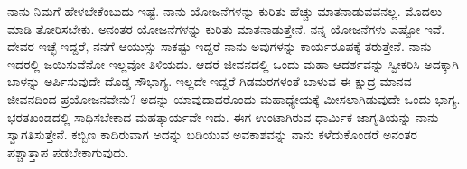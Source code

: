 ನಾನು ನಿಮಗೆ ಹೇಳಬೇಕೆಂಬುದು ಇಷ್ಟೆ. ನಾನು ಯೋಜನೆಗಳನ್ನು ಕುರಿತು ಹೆಚ್ಚು ಮಾತನಾಡುವವನಲ್ಲ. ಮೊದಲು ಮಾಡಿ ತೋರಿಸಬೇಕು. ಅನಂತರ ಯೋಜನೆಗಳನ್ನು ಕುರಿತು ಮಾತನಾಡುತ್ತೇನೆ. ನನ್ನ ಯೋಜನೆಗಳು ಎಷ್ಟೋ ಇವೆ. ದೇವರ ಇಚ್ಛೆ ಇದ್ದರೆ, ನನಗೆ ಆಯುಸ್ಸು ಸಾಕಷ್ಟು ಇದ್ದರೆ ನಾನು ಅವುಗಳನ್ನು ಕಾರ್ಯರೂಪಕ್ಕೆ ತರುತ್ತೇನೆ. ನಾನು ಇದರಲ್ಲಿ ಜಯಿಸುವೆನೋ ಇಲ್ಲವೋ ತಿಳಿಯದು. ಆದರೆ ಜೀವನದಲ್ಲಿ ಒಂದು ಮಹಾ ಆದರ್ಶವನ್ನು ಸ್ವೀಕರಿಸಿ ಅದಕ್ಕಾಗಿ ಬಾಳನ್ನು ಅರ್ಪಿಸುವುದೇ ದೊಡ್ಡ ಸೌಭಾಗ್ಯ. ಇಲ್ಲದೇ ಇದ್ದರೆ ಗಿಡಮರಗಳಂತೆ ಬಾಳುವ ಈ ಕ್ಷುದ್ರ ಮಾನವ ಜೀವನದಿಂದ ಪ್ರಯೋಜನವೇನು? ಅದನ್ನು ಯಾವುದಾದರೊಂದು ಮಹಾಧ್ಯೇಯಕ್ಕೆ ಮೀಸಲಾಗಿಡುವುದೇ ಒಂದು ಭಾಗ್ಯ. ಭರತಖಂಡದಲ್ಲಿ ಸಾಧಿಸಬೇಕಾದ ಮಹತ್ಕಾರ್ಯವೇ ಇದು. ಈಗ ಉಂಟಾಗಿರುವ ಧಾರ್ಮಿಕ ಜಾಗೃತಿಯನ್ನು ನಾನು ಸ್ವಾಗತಿಸುತ್ತೇನೆ. ಕಬ್ಬಿಣ ಕಾದಿರುವಾಗ ಅದನ್ನು ಬಡಿಯುವ ಅವಕಾಶವನ್ನು ನಾನು ಕಳೆದುಕೊಂಡರೆ ಅನಂತರ ಪಶ್ಚಾತ್ತಾಪ ಪಡಬೇಕಾಗುವುದು. 


